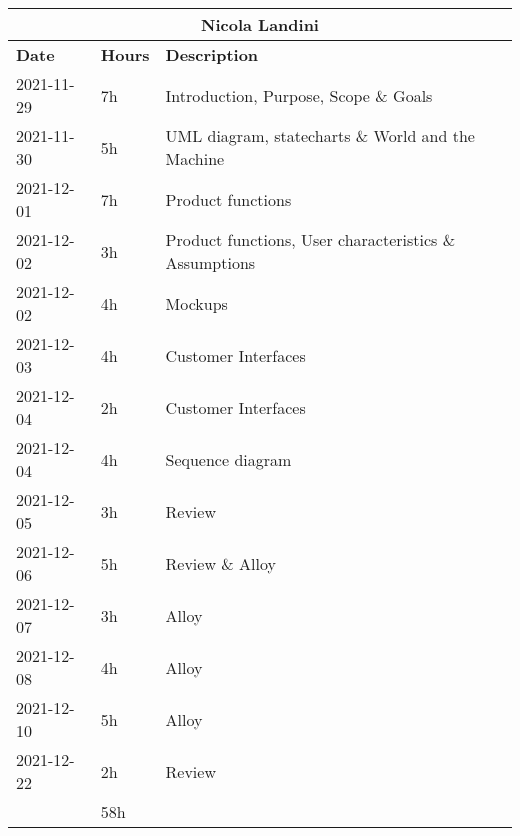 \bigskip
\begin{table}[H]
    \centering
    \begin{tabular}{|l|l|l|}
        \multicolumn{3}{c}{\textbf{Nicola Landini}}                      \\
        \hline
        \textbf{Date} & \textbf{Hours} & \textbf{Description}                                   \\\hline
        2021-11-29    & 7h             & Introduction, Purpose, Scope \& Goals                  \\\hline
        2021-11-30    & 5h             & UML diagram, statecharts \& World and the Machine      \\\hline
        2021-12-01    & 7h             & Product functions                                      \\\hline
        2021-12-02    & 3h             & Product functions, User characteristics \& Assumptions \\\hline
        2021-12-02    & 4h             & Mockups                                                \\\hline
        2021-12-03    & 4h             & Customer Interfaces                                    \\\hline
        2021-12-04    & 2h             & Customer Interfaces                                    \\\hline
        2021-12-04    & 4h             & Sequence diagram                                       \\\hline
        2021-12-05    & 3h             & Review                                                 \\\hline
        2021-12-06    & 5h             & Review \& Alloy                                        \\\hline
        2021-12-07    & 3h             & Alloy                                                  \\\hline
        2021-12-08    & 4h             & Alloy                                                  \\\hline
        2021-12-10    & 5h             & Alloy                                                  \\\hline
        2021-12-22    & 2h             & Review                                                 \\\hline\hline
                      & 58h            &                                                        \\\hline
    \end{tabular}
\end{table}
